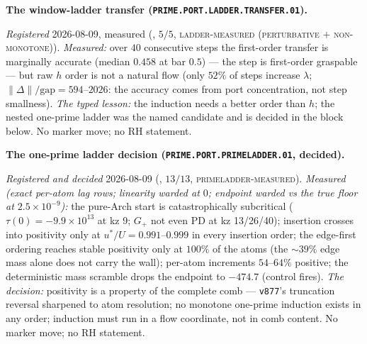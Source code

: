 \documentclass[11pt,a4paper]{article}
\begin{document}
\par\smallskip\noindent\textbf{The window-ladder transfer
(\texttt{PRIME.PORT.LADDER.\allowbreak TRANSFER.01}).}
{\sloppy
\emph{Registered} 2026-08-09, measured
(, $5/5$,
\textsc{ladder-measured (perturbative $+$ non-monotone)}).
\emph{Measured:} over $40$ consecutive steps the first-order
transfer is marginally accurate (median $0.458$ at bar $0.5$)
--- the step is first-order graspable --- but raw $h$ order is
not a natural flow (only $52\%$ of steps increase $\lambda$;
$\|\Delta\|/\mathrm{gap} = 594$--$2026$: the accuracy comes from
port concentration, not step smallness).  \emph{The typed
lesson:} the induction needs a better order than $h$; the nested
one-prime ladder was the named candidate and is decided in the
block below.  No marker move; no RH statement.\par}

\par\smallskip\noindent\textbf{The one-prime ladder decision
(\texttt{PRIME.PORT.\allowbreak PRIMELADDER.01}, decided).}
{\sloppy
\emph{Registered and decided} 2026-08-09
(, $13/13$,
\textsc{primeladder-measured}).  \emph{Measured (exact per-atom
lag rows; linearity warded at $0$; endpoint warded vs the true
floor at $2.5\times10^{-9}$):} the pure-Arch start is
catastrophically subcritical ($\tau(0) = -9.9\times10^{13}$ at
kz 9; $G_+$ not even PD at kz 13/26/40); insertion crosses into
positivity only at $u^{*}/U = 0.991$--$0.999$ in every insertion
order; the edge-first ordering reaches stable positivity only at
$100\%$ of the atoms (the ${\sim}39\%$ edge mass alone does not
carry the wall); per-atom increments $54$--$64\%$ positive; the
deterministic mass scramble drops the endpoint to $-474.7$
(control fires).  \emph{The decision:} positivity is a property
of the complete comb --- \texttt{v877}'s truncation reversal
sharpened to atom resolution; no monotone one-prime induction
exists in any order; induction must run in a flow coordinate,
not in comb content.  No marker move; no RH statement.\par}
\end{document}
